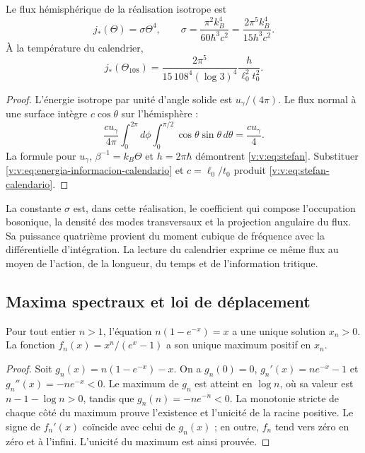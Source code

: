 \begin{proposition}
\label{v:v:prop:stefan}
Le flux hémisphérique de la réalisation isotrope est
\begin{equation}
 j_*(\Theta)=\sigma\Theta^4,\qquad
 \sigma=\frac{\pi^2 k_B^4}{60\hbar^3c^2}
 =\frac{2\pi^5k_B^4}{15h^3c^2}.
 \label{v:v:eq:stefan}
\end{equation}
À la température du calendrier,
\begin{equation}
 j_*(\Theta_{108})
 =\frac{2\pi^5}{15\,108^4(\log3)^4}
 \frac{h}{\ell_0^2t_0^2}.
 \label{v:v:eq:stefan-calendario}
\end{equation}
\end{proposition}
\begin{proof}
L’énergie isotrope par unité d’angle solide est
\(u_\gamma/(4\pi)\). Le flux normal à une surface intègre
\(c\cos\theta\) sur l’hémisphère :
\[
 \frac{cu_\gamma}{4\pi}
 \int_0^{2\pi}\!d\phi\int_0^{\pi/2}\cos\theta\sin\theta\,d\theta
 =\frac{cu_\gamma}{4}.
\]
La formule pour \(u_\gamma\), \(\beta^{-1}=k_B\Theta\) et
\(h=2\pi\hbar\) démontrent \eqref{v:v:eq:stefan}.
Substituer \eqref{v:v:eq:energia-informacion-calendario} et
\(c=\ell_0/t_0\) produit \eqref{v:v:eq:stefan-calendario}.
\end{proof}

La constante \(\sigma\) est, dans cette réalisation, le coefficient
qui compose l’occupation bosonique, la densité des modes transversaux et
la projection angulaire du flux. Sa puissance quatrième provient du moment
cubique de fréquence avec la différentielle d’intégration. La lecture
du calendrier exprime ce même flux au moyen de l’action, de la longueur,
du temps et de l’information tritique.

\newpage
\subsection{Maxima spectraux et loi de déplacement}

\begin{lemma}
\label{v:v:lem:raiz-wien}
Pour tout entier \(n>1\), l’équation
\(n(1-e^{-x})=x\) a une unique solution \(x_n>0\).
La fonction \(f_n(x)=x^n/(e^x-1)\) a son unique maximum positif en
\(x_n\).
\end{lemma}
\begin{proof}
Soit \(g_n(x)=n(1-e^{-x})-x\). On a
\(g_n(0)=0\), \(g_n'(x)=ne^{-x}-1\) et
\(g_n''(x)=-ne^{-x}<0\). Le maximum de \(g_n\) est atteint en
\(\log n\), où sa valeur est \(n-1-\log n>0\), tandis que
\(g_n(n)=-ne^{-n}<0\). La monotonie stricte de chaque côté du maximum
prouve l’existence et l’unicité de la racine positive. Le signe de
\(f_n'(x)\) coïncide avec celui de \(g_n(x)\) ; en outre, \(f_n\) tend
vers zéro en zéro et à l’infini. L’unicité du maximum est ainsi prouvée.
\end{proof}

